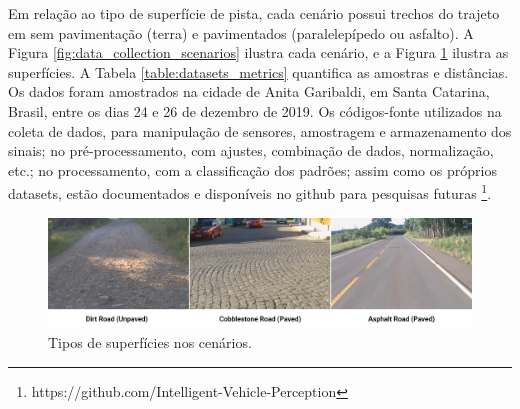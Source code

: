 Em relação ao tipo de superfície de pista, cada cenário possui trechos do trajeto em sem pavimentação (terra) e pavimentados (paralelepípedo ou asfalto). A Figura \ref{fig:data_collection_scenarios} ilustra cada cenário, e a Figura \ref{fig:data_collection_surface_types} ilustra as superfícies. A Tabela \ref{table:datasets_metrics} quantifica as amostras e distâncias. Os dados foram amostrados na cidade de Anita Garibaldi, em Santa Catarina, Brasil, entre os dias 24 e 26 de dezembro de 2019. Os códigos-fonte utilizados na coleta de dados, para manipulação de sensores, amostragem e armazenamento dos sinais; no pré-processamento, com ajustes, combinação de dados, normalização, etc.; no processamento, com a classificação dos padrões; assim como os próprios datasets, estão documentados e disponíveis no github para pesquisas futuras \footnote{https://github.com/Intelligent-Vehicle-Perception}.

\begin{figure}[h!]
  \centering
  \includegraphics[width=1\textwidth]{figuras/surface_type.png}
  \caption{Tipos de superfícies nos cenários.}
  \label{fig:data_collection_surface_types}
\end{figure}

